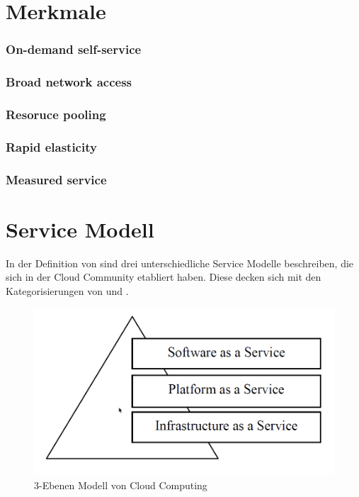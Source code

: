 \section{Merkmale}
\subsubsection{On-demand self-service}\label{selfservice}
\subsubsection{Broad network access}\label{networkaccess}
\subsubsection{Resoruce pooling}\label{resourcepooling}
\subsubsection{Rapid elasticity}\label{rapidelasticity}
\subsubsection{Measured service}\label{measuredservice}
\cite*[vgl.][S.2]{Mell.2011}

\section{Service Modell}\label{serviceModell}
In der Definition von \cite*[S.2]{Mell.2011} sind drei unterschiedliche Service Modelle beschreiben, die sich in der Cloud Community etabliert haben. Diese decken sich mit den Kategorisierungen von \cite[S. 28]{Tharam.2010} und \cite[S. 878]{Jadeja.2012}.

	\begin{figure}[h]
		\centering
		\includegraphics[width=0.7\linewidth]{images/cloud_computing_pyramide}
		\caption{3-Ebenen Modell von Cloud Computing}
		\label{fig:CloudComputingPyramide}
	\end{figure}


